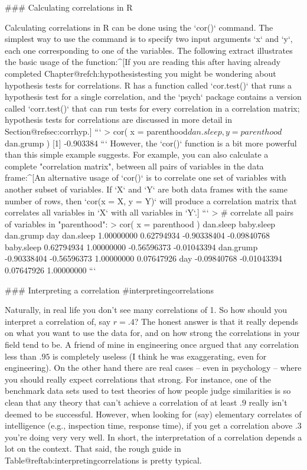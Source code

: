 ### Calculating correlations in R



Calculating correlations in R can be done using the `cor()` command. The simplest way to use the command is to specify two input arguments `x` and `y`, each one corresponding to one of the variables. The following extract illustrates the basic usage of the function:^[If you are reading this after having already completed Chapter@refch:hypothesistesting you might be wondering about hypothesis tests for correlations. R has a function called `cor.test()` that runs a hypothesis test for a single correlation, and the `psych` package contains a version called `corr.test()` that can run tests for every correlation in a correlation matrix; hypothesis tests for correlations are discussed in more detail in Section@refsec:corrhyp.]
```
> cor( x = parenthood$dan.sleep, y = parenthood$dan.grump )
[1] -0.903384
```
However, the `cor()` function is a bit more powerful than this simple example suggests. For example, you can also calculate a complete "correlation matrix", between all pairs of variables in the data frame:^[An alternative usage of `cor()` is to correlate one set of variables with another subset of variables. If `X` and `Y` are both data frames with the same number of rows, then `cor(x = X, y = Y)` will produce a correlation matrix that correlates all variables in `X` with all variables in `Y`.]
```
> # correlate all pairs of variables in "parenthood":
> cor( x = parenthood )  
             dan.sleep  baby.sleep   dan.grump         day
dan.sleep   1.00000000  0.62794934 -0.90338404 -0.09840768
baby.sleep  0.62794934  1.00000000 -0.56596373 -0.01043394
dan.grump  -0.90338404 -0.56596373  1.00000000  0.07647926
day        -0.09840768 -0.01043394  0.07647926  1.00000000
```



### Interpreting a correlation {#interpretingcorrelations}
 
Naturally, in real life you don't see many correlations of 1. So how should you interpret a correlation of, say $r= .4$? The honest answer is that it really depends on what you want to use the data for, and on how strong the correlations in your field tend to be. A  friend of mine in engineering once argued that any correlation less than $.95$ is completely useless (I think he was exaggerating, even for engineering). On the other hand there are real cases -- even in psychology -- where you should really expect correlations that strong. For instance, one of the benchmark data sets used to test theories of how people judge similarities is so clean that any theory that can't achieve a correlation of at least $.9$ really isn't deemed to be successful. However, when looking for (say) elementary correlates of intelligence (e.g., inspection time, response time), if you get a correlation above $.3$ you're doing very very well. In short, the interpretation of a correlation depends a lot on the context. That said, the rough guide in Table@reftab:interpretingcorrelations is pretty typical.

